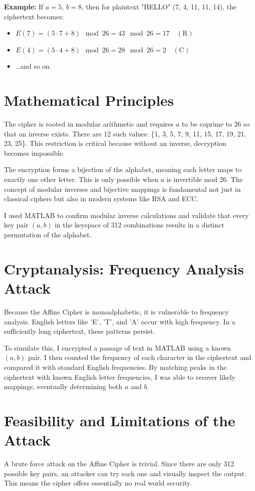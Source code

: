 \documentclass[12pt]{article}
\begin{document}
\textbf{Example:} If \( a = 5 \), \( b = 8 \), then for plaintext "HELLO" (7, 4, 11, 11, 14), the ciphertext becomes:
\begin{itemize}
    \item \( E(7) = (5 \cdot 7 + 8) \mod 26 = 43 \mod 26 = 17 \quad (\text{R}) \)
    \item \( E(4) = (5 \cdot 4 + 8) \mod 26 = 28 \mod 26 = 2 \quad (\text{C}) \)
    \item \ldots and so on.
\end{itemize}

\section*{Mathematical Principles}
The cipher is rooted in modular arithmetic and requires \( a \) to be coprime to 26 so that an inverse exists. There are 12 such values: \{1, 3, 5, 7, 9, 11, 15, 17, 19, 21, 23, 25\}. This restriction is critical because without an inverse, decryption becomes impossible.

The encryption forms a bijection of the alphabet, meaning each letter maps to exactly one other letter. This is only possible when \( a \) is invertible mod 26. The concept of modular inverses and bijective mappings is fundamental not just in classical ciphers but also in modern systems like RSA and ECC.

I used MATLAB to confirm modular inverse calculations and validate that every key pair \( (a, b) \) in the keyspace of 312 combinations results in a distinct permutation of the alphabet.

\section*{Cryptanalysis: Frequency Analysis Attack}
Because the Affine Cipher is monoalphabetic, it is vulnerable to frequency analysis. English letters like 'E', 'T', and 'A' occur with high frequency. In a sufficiently long ciphertext, these patterns persist.

To simulate this, I encrypted a passage of text in MATLAB using a known \( (a, b) \) pair. I then counted the frequency of each character in the ciphertext and compared it with standard English frequencies. By matching peaks in the ciphertext with known English letter frequencies, I was able to recover likely mappings, eventually determining both \( a \) and \( b \).

\section*{Feasibility and Limitations of the Attack}
A brute force attack on the Affine Cipher is trivial. Since there are only 312 possible key pairs, an attacker can try each one and visually inspect the output. This means the cipher offers essentially no real world security.
\end{document}
